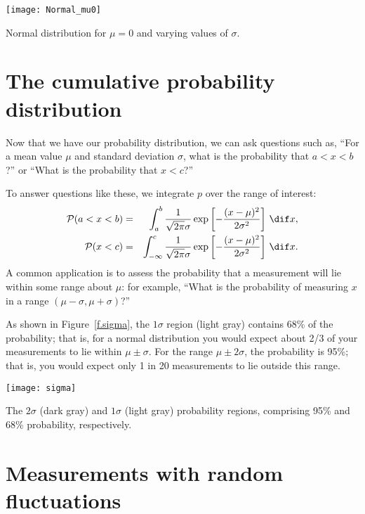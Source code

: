 \begin{marginfigure}
\texttt{[image: Normal\_mu0]}
\caption[Normal distributions with different standard deviations]{Normal distribution for $\mu=0$ and varying values of $\sigma$.}
\label{f.Normal-vary-sigma}
\end{marginfigure}

\section{The cumulative probability distribution}

Now that we have our probability distribution, we can ask questions such as, ``For a mean value $\mu$ and standard deviation $\sigma$, what is the probability that $a < x < b$?'' or ``What is the probability that $x < c$?''

To answer questions like these, we integrate $p$ over the range of interest:
\begin{eqnarray*}
	\prob(a< x < b) &=& \int_{a}^{b} \frac{1}{\sqrt{2\pi}\sigma}\exp\left[-\frac{(x-\mu)^{2}}{2\sigma^{2}}\right]\,\dif x,\\
	\prob(x < c) &=& \int_{-\infty}^{c} \frac{1}{\sqrt{2\pi}\sigma}\exp\left[-\frac{(x-\mu)^{2}}{2\sigma^{2}}\right]\,\dif x.
\end{eqnarray*}
A common application is to assess the probability that a measurement will lie within some range about $\mu$: for example, ``What is the probability of measuring $x$ in a range $(\mu-\sigma,\mu+\sigma)$?'' 

As shown in Figure~\ref{f.sigma}, the $1\sigma$ region (light gray) contains 68\% of the probability; that is, for a normal distribution you would expect about 2/3 of your measurements to lie within $\mu \pm \sigma$.  For the range $\mu \pm 2\sigma$, the probability is 95\%; that is, you would expect only 1 in 20 measurements to lie outside this range.

\begin{marginfigure}
\texttt{[image: sigma]}
\caption[Proability regions for one and two standard deviations]{The $2\sigma$ (dark gray) and $1\sigma$ (light gray) probability regions, comprising 95\% and 68\% probability, respectively.}
\label{f.sigma}
\end{marginfigure}


\section{Measurements with random fluctuations}

